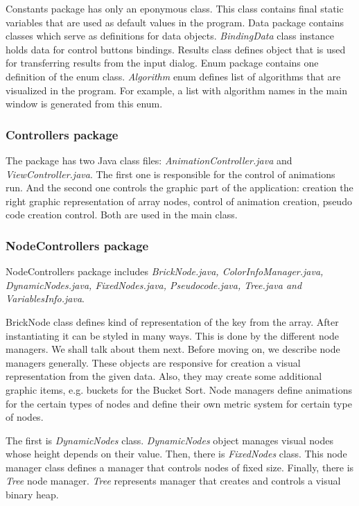 \documentclass[
  field=inf,
  biblatex,
  language=english,
  glossaries,
  theorems=false,
  sourcecodes=false,
  index
]{kidiplom}
\begin{document}
Constants package has only an eponymous class. This class contains final static variables that are used as default values in the program. Data package contains classes which serve as definitions for data objects. \textit{BindingData} class instance holds data for control buttons bindings. Results class defines object that is used for transferring results from the input dialog. Enum package contains one definition of the enum class. \textit{Algorithm} enum defines list of algorithms that are visualized in the program. For example, a list with algorithm names in the main window is generated from this enum.

\subsubsection{Controllers package}
The package has two Java class files: \textit{AnimationController.java} and \textit{ViewController.java}. The first one is responsible for the control of animations run. And the second one controls the graphic part of the application: creation the right graphic representation of array nodes, control of animation creation, pseudo code creation control. Both are used in the main class.

\subsubsection{NodeControllers package}
NodeControllers package includes \textit{BrickNode.java, ColorInfoManager.java, DynamicNodes.java, FixedNodes.java, Pseudocode.java, Tree.java and VariablesInfo.java}.

BrickNode class defines kind of representation of the key from the array. After instantiating it can be styled in many ways. This is done by the different node managers. We shall talk about them next. Before moving on, we describe node managers generally. These objects are responsive for creation a visual representation from the given data. Also, they may create some additional graphic items, e.g. buckets for the Bucket Sort. Node managers define animations for the certain types of nodes and define their own metric system for certain type of nodes.

The first is \textit{DynamicNodes} class. \textit{DynamicNodes} object manages visual nodes whose height depends on their value. Then, there is \textit{FixedNodes} class. This node manager class defines a manager that controls nodes of fixed size. Finally, there is \textit{Tree} node manager. \textit{Tree} represents manager that creates and controls a visual binary heap. 
\end{document}

